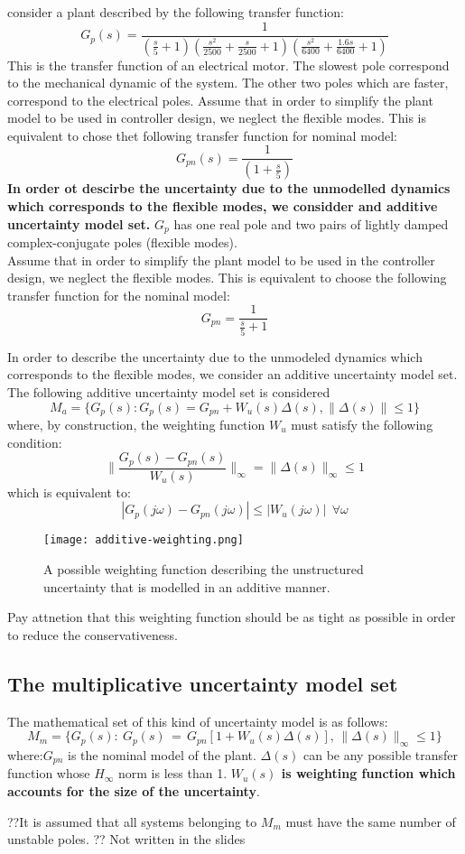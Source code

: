\begin{example}
consider a plant described by the following transfer function:
\[
G_p(s) = \frac{1}{\left( \frac{s}{5} + 1 \right) \left( \frac{s^2}{2500} + \frac{s}{2500} + 1 \right) \left( \frac{s^2}{6400} + \frac{1.6s}{6400} + 1 \right)}
\]
This is the transfer function of an electrical motor. The slowest pole correspond to the mechanical dynamic of the system. The other two poles which are faster, correspond to the electrical poles. Assume that in order to simplify the plant model to be used in controller design, we neglect the flexible modes. This is equivalent to chose thet following transfer function for nominal model:
\[
G_{pn}(s)=\frac{1}{(1+\frac{s}{5})}
\]
\textbf{In order ot descirbe the uncertainty due to the unmodelled dynamics which corresponds to the flexible modes, we considder and additive uncertainty model set.}
$G_p$ has one real pole and two pairs of lightly damped complex-conjugate poles (flexible modes). \\
Assume that in order to simplify the plant model to be used in the controller design, we neglect the flexible modes. This is equivalent to choose the following transfer function for the nominal model:\\
\[
G_{pn} = \frac{1}{\frac{s}{5}+1}
\]
\end{example}
In order to describe the uncertainty due to the unmodeled dynamics which corresponds to the flexible modes, we consider an additive uncertainty model set.
The following additive uncertainty model set is considered 
\[
M_a = \{G_p(s): G_p(s) = G_{pn} + W_u(s)\Delta(s), \|\Delta(s)\|\leq 1\}
\]
where, by construction, the weighting function $W_u$ must satisfy the following condition:
\[
\|\frac{G_p(s)-G_{pn}(s)}{W_u(s)}\|_\infty = \|\Delta(s)\|_\infty \leq 1
\]
which is equivalent to:
\[
|G_p(j\omega)-G_{pn}(j\omega)| \leq |W_u(j\omega)| \:\:\forall \omega
\]


\begin{figure}[H]
    \centering
    \texttt{[image: additive-weighting.png]}
    \caption{A possible weighting function describing the unstructured uncertainty that is modelled in an additive manner.}
\end{figure}

Pay attnetion that this weighting function should be as tight as possible in order to reduce the conservativeness.


\subsection{The multiplicative uncertainty model set}
The mathematical set of this kind of uncertainty model is as follows:
\[
M_m = \{G_p(s):\:G_p(s)\,=\,G_{pn}[1 + W_u(s)\Delta(s)],\,\|\Delta(s)\|_\infty\leq 1 \}
\]
where:$G_{pn}$ is the nominal model of the plant. $\Delta(s)$ can be any possible transfer function whose $H_\infty$ norm is less than 1. \textbf{$W_u(s)$ is weighting function which accounts for the size of the uncertainty}. 
\begin{QandAbox}
??It is assumed that all systems belonging to $M_m$ must have the same number of unstable poles. ?? Not written in the slides
\end{QandAbox}

